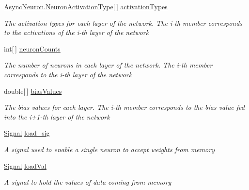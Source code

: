 \begin{DoxyCompactItemize}
\hyperlink{class_n_n_gen_1_1_async_neuron_afe8460a52808d1587cbcc0a8e4e23b64}{Async\+Neuron.\+Neuron\+Activation\+Type}\mbox{[}$\,$\mbox{]} \hyperlink{class_n_n_gen_1_1_async_neural_network_ad1d4a0489b5e32e36e8927eee2992725}{activation\+Types}
\begin{DoxyCompactList}\small\item\em The activation types for each layer of the network. The i-\/th member corresponds to the activations of the i-\/th layer of the network \end{DoxyCompactList}\item 
int\mbox{[}$\,$\mbox{]} \hyperlink{class_n_n_gen_1_1_async_neural_network_aec2195cbfa8c8f568dc512ab511d06c0}{neuron\+Counts}
\begin{DoxyCompactList}\small\item\em The number of neurons in each layer of the network. The i-\/th member corresponds to the i-\/th layer of the network \end{DoxyCompactList}\item 
double\mbox{[}$\,$\mbox{]} \hyperlink{class_n_n_gen_1_1_async_neural_network_aaccc75ccaaf278324874a5c3b45d711f}{bias\+Values}
\begin{DoxyCompactList}\small\item\em The bias values for each layer. The i-\/th member corresponds to the bias value fed into the i+1-\/th layer of the network \end{DoxyCompactList}\item 
\hyperlink{class_n_n_gen_1_1_signal}{Signal} \hyperlink{class_n_n_gen_1_1_async_neural_network_a4bb7830d6bbc7f19ea5eefdb49ab848a}{load\+\_\+sig}
\begin{DoxyCompactList}\small\item\em A signal used to enable a single neuron to accept weights from memory \end{DoxyCompactList}\item 
\hyperlink{class_n_n_gen_1_1_signal}{Signal} \hyperlink{class_n_n_gen_1_1_async_neural_network_aced8cd708a7084592d28cbcca93a7278}{load\+Val}
\begin{DoxyCompactList}\small\item\em A signal to hold the values of data coming from memory \end{DoxyCompactList}\item 

\end{DoxyCompactItemize}
